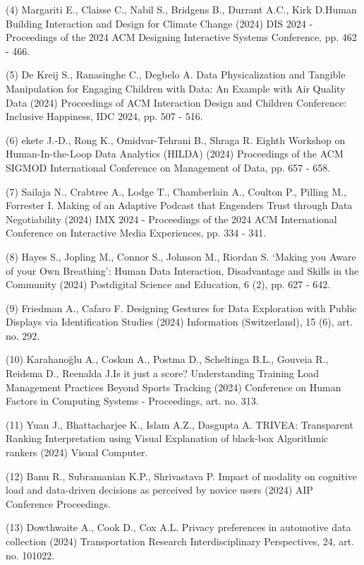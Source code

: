 \documentclass[
	12pt,				%
	oneside,			%
	a4paper,			%
	english,			%
	brazil				%
	]{abntex2ppgsi}
\begin{document}
\begin{apendicesenv}
(4) Margariti E., Claisse C., Nabil S., Bridgens B., Durrant A.C., Kirk D.Human Building Interaction and Design for Climate Change (2024) DIS 2024 - Proceedings of the 2024 ACM Designing Interactive Systems Conference, pp. 462 - 466. 

(5) De Kreij S., Ranasinghe C., Degbelo A. Data Physicalization and Tangible Manipulation for Engaging Children with Data: An Example with Air Quality Data (2024) Proceedings of ACM Interaction Design and Children Conference: Inclusive Happiness, IDC 2024, pp. 507 - 516.

(6) ekete J.-D., Rong K., Omidvar-Tehrani B., Shraga R.
Eighth Workshop on Human-In-the-Loop Data Analytics (HILDA)
(2024) Proceedings of the ACM SIGMOD International Conference on Management of Data, pp. 657 - 658.

(7) Sailaja N., Crabtree A., Lodge T., Chamberlain A., Coulton P., Pilling M., Forrester I. Making of an Adaptive Podcast that Engenders Trust through Data Negotiability
(2024) IMX 2024 - Proceedings of the 2024 ACM International Conference on Interactive Media Experiences, pp. 334 - 341.

(8) Hayes S., Jopling M., Connor S., Johnson M., Riordan S.
‘Making you Aware of your Own Breathing’: Human Data Interaction, Disadvantage and Skills in the Community (2024) Postdigital Science and Education, 6 (2), pp. 627 - 642.


(9) Friedman A., Cafaro F. Designing Gestures for Data Exploration with Public Displays via Identification Studies
(2024) Information (Switzerland), 15 (6), art. no. 292.

(10) Karahanoğlu A., Coskun A., Postma D., Scheltinga B.L., Gouveia R., Reidsma D., Reenalda J.Is it just a score? Understanding Training Load Management Practices Beyond Sports Tracking (2024) Conference on Human Factors in Computing Systems - Proceedings, art. no. 313.

(11) Yuan J., Bhattacharjee K., Islam A.Z., Dasgupta A. TRIVEA: Transparent Ranking Interpretation using Visual Explanation of black-box Algorithmic rankers (2024) Visual Computer.

(12) Banu R., Subramanian K.P., Shrivastava P. Impact of modality on cognitive load and data-driven decisions as perceived by novice users (2024) AIP Conference Proceedings.

(13) Dowthwaite A., Cook D., Cox A.L. Privacy preferences in automotive data collection (2024) Transportation Research Interdisciplinary Perspectives, 24, art. no. 101022.


\end{apendicesenv}
\end{document}
